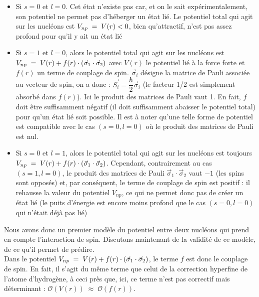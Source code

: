 \begin{itemize}

    \item Si $s=0$ et $l=0$. Cet état n'existe pas car, et on le sait expérimentalement, son potentiel ne permet pas d'héberger un état lié. Le potentiel total qui agit sur les nucléons est $V_{np} \; = \; V(r)<0$, bien qu'attractif, n'est pas assez profond pour qu'il y ait un état lié\\[4pt]
    
    \item Si $s=1$ et $l=0$, alors le potentiel total qui agit sur les nucléons est $V_{np} \; = \; V(r) + f(r) \cdot (\vec{\sigma}_1 \cdot \vec{\sigma}_2)$ avec $V(r)$ le potentiel lié à la force forte et $f(r)$ un terme de couplage de spin. $\vec{\sigma}_i$ désigne la matrice de Pauli associée au vecteur de spin, on a donc : $\vec{S_i} = \dfrac{\hbar}{2}\vec{\sigma}_i$ (le facteur 1/2 est simplement absorbé dans $f(r)$). Ici le produit des matrices de Pauli vaut 1.  En fait, $f$ doit être suffisamment négatif (il doit suffisamment abaisser le potentiel total) pour qu'un état lié soit possible. Il est à noter qu'une telle forme de potentiel est compatible avec le cas $(s=0,l=0)$ où le produit des matrices de Pauli est nul.\\[4pt]
    
    \item  Si $s=0$ et $l=1$, alors le potentiel total qui agit sur les nucléons est toujours $V_{np} \; = \; V(r) + f(r) \cdot (\vec{\sigma}_1 \cdot \vec{\sigma}_2)$. Cependant, contrairement au cas $(s=1,l=0)$, le produit des matrices de Pauli $\vec{\sigma}_1 \cdot \vec{\sigma}_2$ vaut $-1$ (les spins sont opposés) et, par conséquent, le terme de couplage de spin est positif : il rehausse la valeur du potentiel $V_{np}$, ce qui ne permet donc pas de créer un état lié (le puits d'énergie est encore moins profond que le cas $(s=0,l=0)$ qui n'était déjà pas lié)\\[4pt] 
    
\end{itemize}

Nous avons donc un premier modèle du potentiel entre deux nucléons qui prend en compte l'interaction de spin. Discutons maintenant de la validité de ce modèle, de ce qu'il permet de prédire.\\

Dans le potentiel $V_{np} \; = \; V(r) + f(r) \cdot (\vec{\sigma}_1 \cdot \vec{\sigma}_2)$, le terme $f$ est donc le couplage de spin. En fait, il s'agit du même terme que celui de la correction hyperfine de l'atome d'hydrogène, à ceci près que, ici, ce terme n'est pas correctif mais déterminant : $\mathcal{O}(V(r)) \;\approx\; \mathcal{O}(f(r))$.

